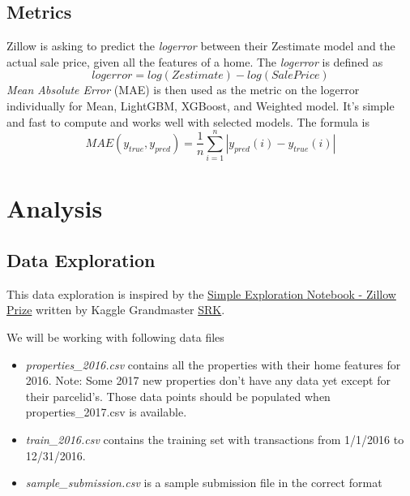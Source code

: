 \documentclass[a4paper]{article}
\begin{document}
\subsection{Metrics}
%
%
Zillow is asking to predict the \textit{logerror} between their Zestimate model and the
actual sale price, given all the features of a home. The \textit{logerror} is defined as
\[ logerror = log(Zestimate) - log(SalePrice) \]
\textit{Mean Absolute Error} (MAE) is then used as the metric on the logerror individually for Mean, LightGBM, XGBoost, and Weighted model. It's simple and fast to compute and works well with selected models. The formula is 
\[ MAE(y_{true}, y_{pred}) = \frac{1}{n} \sum_{i=1}^{n} |y_{pred}(i) - y_{true}(i)| \]


\section{Analysis}

\subsection{Data Exploration}
This data exploration is inspired by the \href{https://www.kaggle.com/sudalairajkumar/simple-exploration-notebook-zillow-prize}{Simple Exploration Notebook - Zillow Prize} written by Kaggle Grandmaster \href{https://www.kaggle.com/sudalairajkumar}{SRK}.

We will be working with following data files
\begin{itemize}
    \item \textit{properties\_2016.csv} contains all the properties with their home features for 2016. Note: Some 2017 new
    properties don't have any data yet except for their parcelid's. Those data points should be populated when
    properties\_2017.csv is available.
    \item \textit{train\_2016.csv} contains the training set with transactions from 1/1/2016 to 12/31/2016.
    \item \textit{sample\_submission.csv} is a sample submission file in the correct format
\end{itemize}
\end{document}
